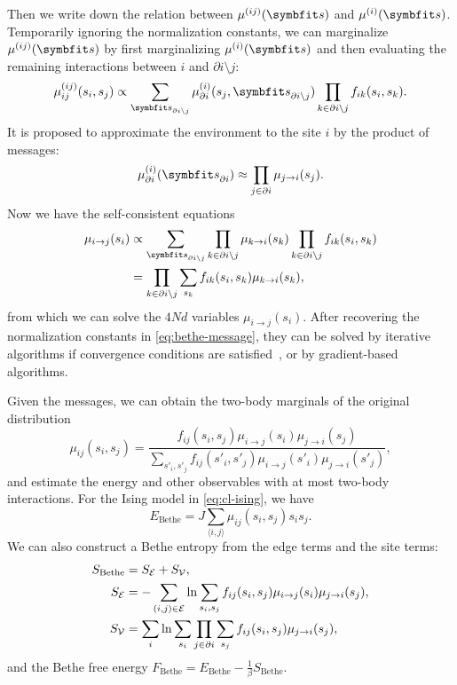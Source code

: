 Then we write down the relation between $\mu^{(i j)}(\vs)$ and $\mu^{(i)}(\vs)$. Temporarily ignoring the normalization constants, we can marginalize $\mu^{(i j)}(\vs)$ by first marginalizing $\mu^{(i)}(\vs)$ and then evaluating the remaining interactions between $i$ and $\partial i \setminus j$:
\begin{equation}
\mu^{(i j)}_{i j}(s_i, s_j) \propto \sum_{\vs_{\partial i \setminus j}} \mu^{(i)}_{\partial i}(s_j, \vs_{\partial i \setminus j}) \prod_{k \in \partial i \setminus j} f_{i k}(s_i, s_k).
\end{equation}
It is proposed to approximate the environment to the site $i$ by the product of messages:
\begin{equation}
\mu^{(i)}_{\partial i}(\vs_{\partial i}) \approx \prod_{j \in \partial i} \mu_{j \to i}(s_j).
\label{eq:bethe-prob}
\end{equation}
Now we have the self-consistent equations
\begin{align}
\mu_{i \to j}(s_i) &\propto \sum_{\vs_{\partial i \setminus j}} \prod_{k \in \partial i \setminus j} \mu_{k \to i}(s_k) \prod_{k \in \partial i \setminus j} f_{i k}(s_i, s_k) \\
&= \prod_{k \in \partial i \setminus j} \sum_{s_k} f_{i k}(s_i, s_k) \mu_{k \to i}(s_k),
\label{eq:bethe-message}
\end{align}
from which we can solve the $4 N d$ variables $\mu_{i \to j}(s_i)$. After recovering the normalization constants in \cref{eq:bethe-message}, they can be solved by iterative algorithms if convergence conditions are satisfied~\cite{mooij2007sufficient}, or by gradient-based algorithms.

Given the messages, we can obtain the two-body marginals of the original distribution
\begin{equation}
\mu_{i j}(s_i, s_j) = \frac{f_{i j}(s_i, s_j) \mu_{i \to j}(s_i) \mu_{j \to i}(s_j)}{\sum_{s'_i, s'_j} f_{i j}(s'_i, s'_j) \mu_{i \to j}(s'_i) \mu_{j \to i}(s'_j)},
\end{equation}
and estimate the energy and other observables with at most two-body interactions. For the Ising model in \cref{eq:cl-ising}, we have
\begin{equation}
E_\text{Bethe} = J \sum_{\langle i, j \rangle} \mu_{i j}(s_i, s_j) s_i s_j.
\end{equation}
We can also construct a Bethe entropy from the edge terms and the site terms:
\begin{align}
S_\text{Bethe} &= S_{\mathcal{E}} + S_{\mathcal{V}}, \\
S_{\mathcal{E}} &= -\sum_{(i, j) \in \mathcal{E}} \ln \sum_{s_i, s_j} f_{i j}(s_i, s_j) \mu_{i \to j}(s_i) \mu_{j \to i}(s_j), \\
S_{\mathcal{V}} &= \sum_i \ln \sum_{s_i} \prod_{j \in \partial i} \sum_{s_j} f_{i j}(s_i, s_j) \mu_{j \to i}(s_j),
\end{align}
and the Bethe free energy $F_\text{Bethe} = E_\text{Bethe} - \frac{1}{\beta} S_\text{Bethe}$.

